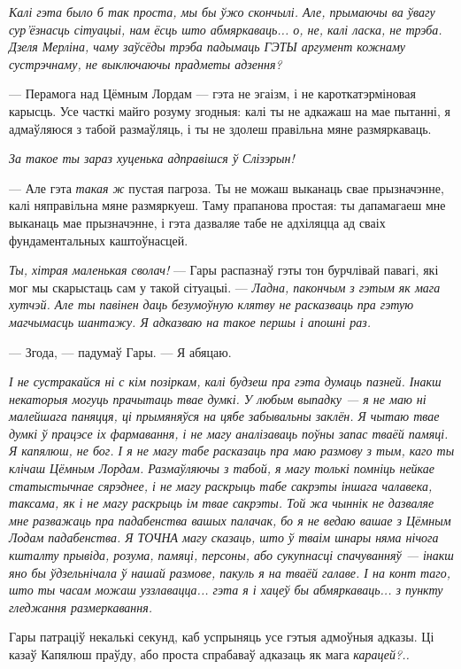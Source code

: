 \emph{Калі гэта было б так проста, мы бы ўжо скончылі. Але, прымаючы ва ўвагу
сур'ёзнасць сітуацыі, нам ёсць што абмяркаваць... о, не, калі ласка, не трэба.
Дзеля Мерліна, чаму заўсёды трэба падымаць ГЭТЫ аргумент кожнаму сустрэчнаму,
не выключаючы прадметы адзення?}

--- Перамога над Цёмным Лордам --- гэта не эгаізм, і не кароткатэрміновая
карысць. Усе часткі майго розуму згодныя: калі ты не адкажаш на мае пытанні, 
я адмаўляюся з табой размаўляць, і ты не здолеш правільна мяне размяркаваць.
    
\emph{За такое ты зараз хуценька адправішся ў Слізэрын!}

--- Але гэта \emph{такая ж} пустая пагроза. Ты не можаш выканаць свае прызначэнне,
калі няправільна мяне размяркуеш. Таму прапанова простая: ты дапамагаеш мне
выканаць мае прызначэнне, і гэта дазваляе табе не адхіляцца ад сваіх
фундаментальных каштоўнасцей.

\emph{Ты, хітрая маленькая сволач!} --- Гары распазнаў гэты тон бурчлівай павагі,
які мог мы скарыстаць сам у такой сітуацыі. --- 
\emph{Ладна, пакончым з гэтым як мага хутчэй. Але ты павінен даць 
безумоўную клятву не расказваць пра гэтую магчымасць шантажу.
Я адказваю на такое першы і апошні раз.}

--- Згода, --- падумаў Гары. --- Я абяцаю.

\emph{І не сустракайся ні с кім позіркам, калі будзеш пра гэта думаць 
пазней. Інакш некаторыя могуць прачытаць твае думкі.
У любым выпадку --- я не маю ні малейшага паняцця, ці прымяняўся на цябе
забывальны заклён. Я чытаю твае думкі ў працэсе іх фармавання, і не 
магу аналізаваць поўны запас тваёй памяці. Я капялюш, не бог.
І я не магу табе расказаць пра маю размову з тым, каго ты клічаш 
Цёмным Лордам. Размаўляючы з табой, я магу толькі помніць нейкае статыстычнае
сярэднее, і не магу раскрыць табе сакрэты іншага чалавека, таксама, як і не
магу раскрыць ім твае сакрэты. Той жа чыннік не дазваляе мне разважаць пра 
падабенства вашых палачак, бо я не ведаю вашае з Цёмным Лодам падабенства.
Я ТОЧНА магу сказаць, што ў тваім шнары няма нічога кшталту прывіда, 
розума, памяці, персоны, або сукупнасці спачуванняў --- інакш яно бы ўдзельнічала
ў нашай размове, пакуль я на тваёй галаве. І на конт таго, што ты часам 
можаш уззлавацца... гэта я і хацеў бы абмяркаваць... з пункту гледжання 
размеркавання.}

Гары патраціў некалькі секунд, каб успрыняць усе гэтыя адмоўныя адказы. Ці 
казаў Капялюш праўду, або проста спрабаваў адказаць
як мага \emph{карацей?..}


